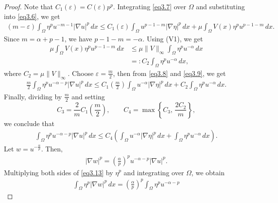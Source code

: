 \documentclass[12pt]{extarticle}
\theoremstyle{definition}
\theoremstyle{remark}
\theoremstyle{definition}
\numberwithin{equation}{section}
\numberwithin{equation}{section}
\begin{document}
\begin{proof}
				Note that $C_1(\varepsilon) = C(\varepsilon) p^p$. Integrating \eqref{eq3.7} over $\Omega$ and substituting into \eqref{eq3.6}, we get
				\begin{align}
					(m-\varepsilon)
					\int_{\Omega}
					\eta^p
					u^{-m-1}
					|\nabla u|^p\,dx
					\le
					C_1(\varepsilon)
					\int_{\Omega}
					u^{p-1-m}
					|\nabla\eta|^p\,dx
					+
					\mu
					\int_{\Omega}
					V(x)\eta^pu^{p-1-m}\,dx.
					\label{eq3.8}
				\end{align}				
				Since $m=\alpha+p-1$, we have $p-1-m=-\alpha$. Using (V1), we get 
				\begin{align}
					\mu
					\int_{\Omega}
					V(x)\eta^pu^{p-1-m}\,dx
					&\le
					\mu\|V\|_\infty
					\int_{\Omega}
					\eta^pu^{-\alpha}\,dx
					\nonumber\\
					&=:C_2
					\int_{\Omega}
					\eta^pu^{-\alpha}\,dx,
					\label{eq3.9}
				\end{align}
				where $C_2=\mu\|V\|_\infty$. Choose $\varepsilon=\frac{m}{2}$, then from \eqref{eq3.8} and \eqref{eq3.9}, we get
				\begin{align}
					\frac{m}{2}
					\int_{\Omega}
					\eta^pu^{-\alpha-p}
					|\nabla u|^p\,dx
					\le
					C_1\left(\frac m2\right)
					\int_{\Omega}
					u^{-\alpha}
					|\nabla\eta|^p\,dx
					+
					C_2
					\int_{\Omega}
					\eta^pu^{-\alpha}\,dx.
					\label{eq3.10}
				\end{align}				
				Finally, dividing by $\frac m2$ and setting
				\[
				C_3=\frac{2}{m}C_1\left(\frac m2\right),
				\qquad
				C_4=\max\left\{
				C_3,\,
				\frac{2C_2}{m}
				\right\},
				\]
				we conclude that
				\begin{align}
					\int_{\Omega}
					\eta^pu^{-\alpha-p}
					|\nabla u|^p\,dx
					\le
					C_4
					\left(
					\int_{\Omega}
					u^{-\alpha}
					|\nabla\eta|^p\,dx
					+
					\int_{\Omega}
					\eta^pu^{-\alpha}\,dx
					\right).
					\label{eq3.11}
				\end{align}
				Let $w=u^{-\frac{\alpha}{p}}$. Then,
				\begin{align}
					|\nabla w|^p =
					\left(\frac{\alpha}{p}\right)^p
					u^{-\alpha-p}
					|\nabla u|^p.
					\label{eq3.13}
				\end{align}			
				Multiplying both sides of \eqref{eq3.13} by $\eta^p$ and integrating over $\Omega$, we obtain
				\begin{align}
					\int_{\Omega}
					\eta^p
					|\nabla w|^p\,dx
					=
					\left(\frac{\alpha}{p}\right)^p
					\int_{\Omega}
					\eta^p
					u^{-\alpha-p}

\end{align}
\end{proof}
\end{document}
